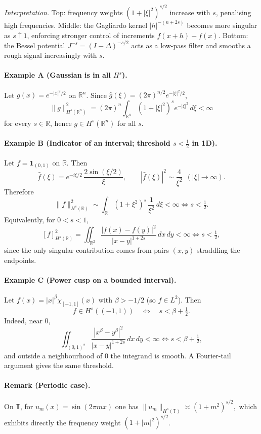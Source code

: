 \documentclass[12pt,a4paper]{article}
\theoremstyle{plain}
\theoremstyle{definition}
\theoremstyle{remark}
\theoremstyle{remark}
\begin{document}
\noindent
\emph{Interpretation.}
Top: frequency weights $(1+|\xi|^2)^{s/2}$ increase with $s$, penalising high frequencies.
Middle: the Gagliardo kernel $|h|^{-(n+2s)}$ becomes more singular as $s\uparrow1$, enforcing stronger
control of increments $f(x+h)-f(x)$.
Bottom: the Bessel potential $J^{-s}=(I-\Delta)^{-s/2}$ acts as a low-pass filter and smooths a rough signal increasingly with $s$.

\clearpage

\paragraph{Example A (Gaussian is in all $H^s$).}
Let $g(x)=e^{-|x|^2/2}$ on $\mathbb R^n$. Since $\widehat g(\xi)=(2\pi)^{n/2}e^{-|\xi|^2/2}$,
\[
\|g\|_{H^s(\mathbb R^n)}^2=(2\pi)^n\int_{\mathbb R^n}(1+|\xi|^2)^s e^{-|\xi|^2}\,d\xi<\infty
\]
for every $s\in\mathbb R$, hence $g\in H^s(\mathbb R^n)$ for all $s$.

\bigskip

\paragraph{Example B (Indicator of an interval; threshold $s<\tfrac12$ in 1D).}
Let $f=\mathbf 1_{(0,1)}$ on $\mathbb R$. Then
\[
\widehat f(\xi)=e^{-i\xi/2}\,\frac{2\sin(\xi/2)}{\xi},\qquad
|\widehat f(\xi)|^2\sim \frac{4}{\xi^2}\ \ (|\xi|\to\infty).
\]
Therefore
\[
\|f\|_{H^s(\mathbb R)}^2\sim \int_{\mathbb R}(1+\xi^2)^s\,\frac{1}{\xi^2}\,d\xi<\infty
\iff s<\tfrac12.
\]
Equivalently, for $0<s<1$,
\[
[f]_{H^s(\mathbb R)}^2
=\iint_{\mathbb R^2}\frac{|f(x)-f(y)|^2}{|x-y|^{1+2s}}\,dx\,dy<\infty
\iff s<\tfrac12,
\]
since the only singular contribution comes from pairs $(x,y)$ straddling the endpoints.

\bigskip

\paragraph{Example C (Power cusp on a bounded interval).}
Let $f(x)=|x|^\beta \chi_{[-1,1]}(x)$ with $\beta>-1/2$ (so $f\in L^2$). Then
\[
f\in H^s((-1,1)) \quad\Longleftrightarrow\quad s<\beta+\tfrac12.
\]
Indeed, near $0$,
\[
\iint_{(0,1)^2}\frac{|x^\beta-y^\beta|^2}{|x-y|^{1+2s}}\,dx\,dy<\infty
\iff s<\beta+\tfrac12,
\]
and outside a neighbourhood of $0$ the integrand is smooth. A Fourier-tail argument gives the same threshold.

\bigskip

\paragraph{Remark (Periodic case).}
On $\mathbb T$, for $u_m(x)=\sin(2\pi m x)$ one has
\(
\|u_m\|_{H^s(\mathbb T)}\asymp (1+m^2)^{s/2},
\)
which exhibits directly the frequency weight $(1+|m|^2)^{s/2}$.
\end{document}
